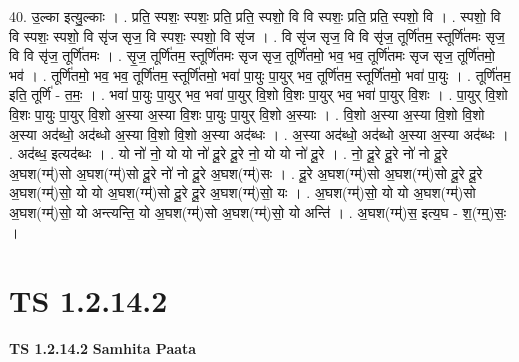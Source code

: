\documentclass[17pt]{extarticle}
\begin{document}
40. उ॒ल्का इत्यु॒ल्काः । . प्रति॒ स्पशः॒ स्पशः॒ प्रति॒ प्रति॒ स्पशो॒ वि वि स्पशः॒ प्रति॒ प्रति॒ स्पशो॒ वि । . स्पशो॒ वि वि स्पशः॒ स्पशो॒ वि सृ॑ज सृज॒ वि स्पशः॒ स्पशो॒ वि सृ॑ज । . वि सृ॑ज सृज॒ वि वि सृ॑ज॒ तूर्णि॑तम॒ स्तूर्णि॑तमः सृज॒ वि वि सृ॑ज॒ तूर्णि॑तमः । . सृ॒ज॒ तूर्णि॑तम॒ स्तूर्णि॑तमः सृज सृज॒ तूर्णि॑तमो॒ भव॒ भव॒ तूर्णि॑तमः सृज सृज॒ तूर्णि॑तमो॒ भव॑ । . तूर्णि॑तमो॒ भव॒ भव॒ तूर्णि॑तम॒ स्तूर्णि॑तमो॒ भवा॑ पा॒युः पा॒युर् भव॒ तूर्णि॑तम॒ स्तूर्णि॑तमो॒ भवा॑ पा॒युः । . तूर्णि॑तम॒ इति॒ तूर्णि॑ - त॒मः॒ । . भवा॑ पा॒युः पा॒युर् भव॒ भवा॑ पा॒युर् वि॒शो वि॒शः पा॒युर् भव॒ भवा॑ पा॒युर् वि॒शः । . पा॒युर् वि॒शो वि॒शः पा॒युः पा॒युर् वि॒शो अ॒स्या अ॒स्या वि॒शः पा॒युः पा॒युर् वि॒शो अ॒स्याः । . वि॒शो अ॒स्या अ॒स्या वि॒शो वि॒शो अ॒स्या अद॑ब्धो॒ अद॑ब्धो अ॒स्या वि॒शो वि॒शो अ॒स्या अद॑ब्धः । . अ॒स्या अद॑ब्धो॒ अद॑ब्धो अ॒स्या अ॒स्या अद॑ब्धः । . अद॑ब्ध॒ इत्यद॑ब्धः । . यो नो॑ नो॒ यो यो नो॑ दू॒रे दू॒रे नो॒ यो यो नो॑ दू॒रे । . नो॒ दू॒रे दू॒रे नो॑ नो दू॒रे अ॒घश(ग्म्॑)सो अ॒घश(ग्म्॑)सो दू॒रे नो॑ नो दू॒रे अ॒घश(ग्म्॑)सः । . दू॒रे अ॒घश(ग्म्॑)सो अ॒घश(ग्म्॑)सो दू॒रे दू॒रे अ॒घश(ग्म्॑)सो॒ यो यो अ॒घश(ग्म्॑)सो दू॒रे दू॒रे अ॒घश(ग्म्॑)सो॒ यः । . अ॒घश(ग्म्॑)सो॒ यो यो अ॒घश(ग्म्॑)सो अ॒घश(ग्म्॑)सो॒ यो अन्त्यन्ति॒ यो अ॒घश(ग्म्॑)सो अ॒घश(ग्म्॑)सो॒ यो अन्ति॑ । . अ॒घश(ग्म्॑)स॒ इत्य॒घ - श॒(ग्म्॒)सः॒ । \newline
\pagebreak
{}
\section*{ TS 1.2.14.2 }

\textbf{TS 1.2.14.2 } \newline
\textbf{Samhita Paata} \newline
\end{document}
